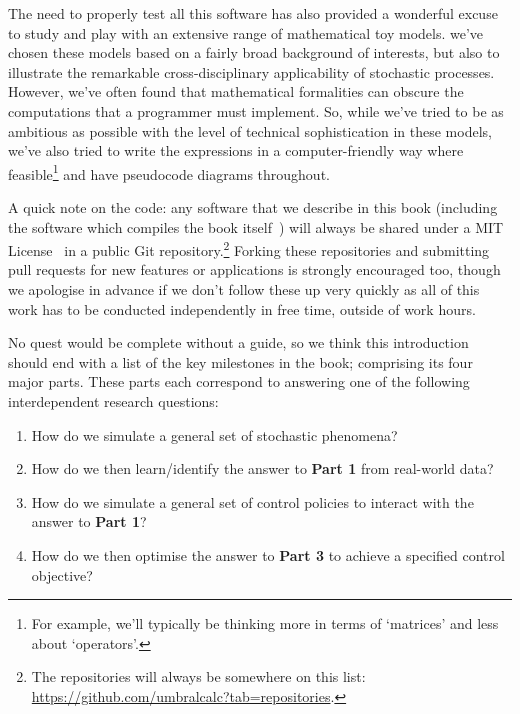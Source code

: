 \documentclass{book}
\begin{document}
The need to properly test all this software has also provided a wonderful excuse to study and play with an extensive range of mathematical toy models. we've chosen these models based on a fairly broad background of interests, but also to illustrate the remarkable cross-disciplinary applicability of stochastic processes. However, we've often found that mathematical formalities can obscure the computations that a programmer must implement. So, while we've tried to be as ambitious as possible with the level of technical sophistication in these models, we've also tried to write the expressions in a computer-friendly way where feasible\footnote{For example, we'll typically be thinking more in terms of `matrices' and less about `operators'.} and have pseudocode diagrams throughout.

A quick note on the code: any software that we describe in this book (including the software which compiles the book itself~\cite{diffusingideasbookgithub}) will always be shared under a MIT License~\cite{mitlicense} in a public Git repository.\footnote{The repositories will always be somewhere on this list: \href{https://github.com/umbralcalc?tab=repositories}{https://github.com/umbralcalc?tab=repositories}.} Forking these repositories and submitting pull requests for new features or applications is strongly encouraged too, though we apologise in advance if we don't follow these up very quickly as all of this work has to be conducted independently in free time, outside of work hours.

No quest would be complete without a guide, so we think this introduction should end with a list of the key milestones in the book; comprising its four major parts. These parts each correspond to answering one of the following interdependent research questions:

\begin{enumerate}[leftmargin=2.5\parindent] 
\item[{\bfseries\sffamily Part 1.}]{How do we simulate a general set of stochastic phenomena?}
\item[{\bfseries\sffamily Part 2.}]{How do we then learn/identify the answer to {\bfseries\sffamily Part 1} from real-world data?}
\item[{\bfseries\sffamily Part 3.}]{How do we simulate a general set of control policies to interact with the answer to {\bfseries\sffamily Part 1}?}
\item[{\bfseries\sffamily Part 4.}]{How do we then optimise the answer to {\bfseries\sffamily Part 3} to achieve a specified control objective?} 
\end{enumerate}
\end{document}
